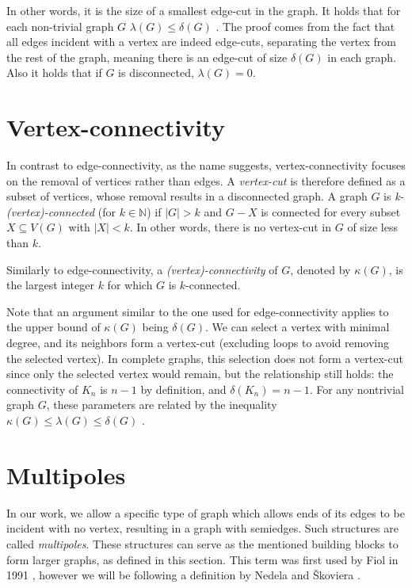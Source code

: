 \documentclass[12pt, twoside]{book}
\begin{document}
In other words, it is the size of a smallest edge-cut in the graph. It holds that for each non-trivial graph $G$ $\lambda(G)\leq\delta(G)$ \cite{Diestel}. The proof comes from the fact that all edges incident with a vertex are indeed edge-cuts, separating the vertex from the rest of the graph, meaning there is an edge-cut of size $\delta(G)$ in each graph. Also it holds that if $G$ is disconnected, $\lambda(G)=0$.

\section{Vertex-connectivity}

In contrast to edge-connectivity, as the name suggests, vertex-connectivity focuses on the removal of vertices rather than edges. A \textit{vertex-cut} is therefore defined as a subset of vertices, whose removal results in a disconnected graph. A graph $G$ is \textit{k-(vertex)-connected} (for $k\in\mathbb{N}$) if $|G|>k$ and $G-X$ is connected for every subset $X\subseteq V(G)$ with $|X|<k$. In other words, there is no vertex-cut in $G$ of size less than $k$.

Similarly to edge-connectivity, a \textit{(vertex)-connectivity} of $G$, denoted by $\kappa(G)$, is the largest integer $k$ for which $G$ is $k$-connected.

Note that an argument similar to the one used for edge-connectivity applies to the upper bound of $\kappa(G)$ being $\delta(G)$. We can select a vertex with minimal degree, and its neighbors form a vertex-cut (excluding loops to avoid removing the selected vertex). In complete graphs, this selection does not form a vertex-cut since only the selected vertex would remain, but the relationship still holds: the connectivity of $K_n$ is $n-1$ by definition, and $\delta(K_n)=n-1$. For any nontrivial graph $G$, these parameters are related by the inequality $\kappa(G)\leq \lambda(G) \leq \delta(G)$ \cite{Diestel}.

\section{Multipoles}\label{sec:multipoles}

In our work, we allow a specific type of graph which allows ends of its edges to be incident with no vertex, resulting in a graph with semiedges. Such structures are called \textit{multipoles}. These structures can serve as the mentioned building blocks to form larger graphs, as defined in this section. This term was first used by Fiol in 1991 \cite{Fiol1991}, however we will be following a definition by Nedela and Škoviera \cite{Nedela1996}.
\end{document}
